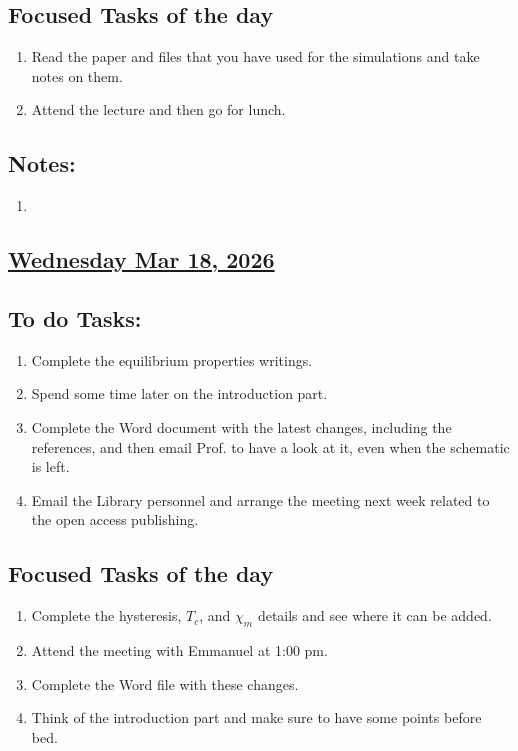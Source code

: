 \subsection*{Focused Tasks of the day}
\begin{enumerate}[\ding{212}]  
    \item Read the paper and files that you have used for the simulations and take notes on them.
    \item Attend the lecture and then go for lunch.
\end{enumerate}
\subsection*{Notes:}
\begin{enumerate}
    \item 
\end{enumerate}
\subsection*{\underline{Wednesday Mar 18, 2026} }
\subsection*{To do Tasks:}
\begin{enumerate}
    \item Complete the equilibrium properties writings.
    \item Spend some time later on the introduction part.
    \item Complete the Word document with the latest changes, including the references, and then email Prof. to have a look at it, even when the schematic is left.
    \item Email the Library personnel and arrange the meeting next week related to the open access publishing.
\end{enumerate}
\subsection*{Focused Tasks of the day}
\begin{enumerate}[\ding{212}]  
    \item Complete the hysteresis, $T_c$, and $\chi_m$ details and see where it can be added. \cmark
    \item Attend the meeting with Emmanuel at 1:00 pm. \cmark 
    \item Complete the Word file with these changes. \xmark
    \item Think of the introduction part and make sure to have some points before bed. 
\end{enumerate}
